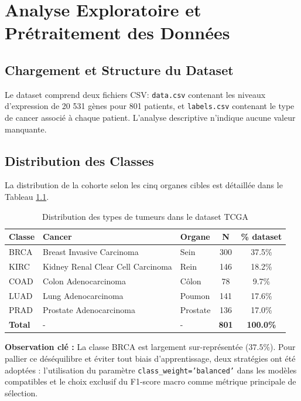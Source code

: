 \documentclass[12pt,a4paper]{report}
\let\oldchapter\chapter
\renewcommand{\chapter}{\clearpage\oldchapter}
\begin{document}
\chapter{Analyse Exploratoire et Pr\'etraitement des Donn\'ees}
\section{Chargement et Structure du Dataset}
Le dataset comprend deux fichiers CSV: \texttt{data.csv} contenant les niveaux d'expression de 20 531 g\`enes pour 801 patients, et \texttt{labels.csv} contenant le type de cancer associ\'e \`a chaque patient. L'analyse descriptive n'indique aucune valeur manquante.

\section{Distribution des Classes}
La distribution de la cohorte selon les cinq organes cibles est d\'etaill\'ee dans le Tableau \ref{tab:dist_classes}.

\begin{table}[H]
\centering
\caption{Distribution des types de tumeurs dans le dataset TCGA}
\label{tab:dist_classes}
\begin{tabular}{lllcc}
\toprule
\textbf{Classe} & \textbf{Cancer} & \textbf{Organe} & \textbf{N} & \textbf{\% dataset} \\
\midrule
BRCA & Breast Invasive Carcinoma & Sein & 300 & 37.5\% \\
KIRC & Kidney Renal Clear Cell Carcinoma & Rein & 146 & 18.2\% \\
COAD & Colon Adenocarcinoma & C\^olon & 78 & 9.7\% \\
LUAD & Lung Adenocarcinoma & Poumon & 141 & 17.6\% \\
PRAD & Prostate Adenocarcinoma & Prostate & 136 & 17.0\% \\
\midrule
\textbf{Total} & - & - & \textbf{801} & \textbf{100.0\%} \\
\bottomrule
\end{tabular}
\end{table}

\begin{infobox}
\textbf{Observation cl\'e : } La classe BRCA est largement sur-repr\'esent\'ee ($37.5\%$). Pour pallier ce déséquilibre et éviter tout biais d'apprentissage, deux strat\'egies ont \'et\'e adopt\'ees : l'utilisation du param\`etre \texttt{class\_weight='balanced'} dans les mod\`eles compatibles et le choix exclusif du F1-score macro comme m\'etrique principale de s\'election.
\end{infobox}
\end{document}
